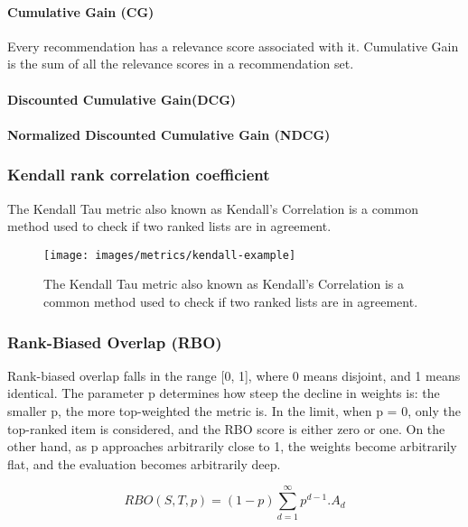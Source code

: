 \paragraph*{Cumulative Gain (CG)}
Every recommendation has a relevance score associated with it. Cumulative Gain is the sum of all the relevance scores in a recommendation set.

\paragraph*{Discounted Cumulative Gain(DCG)}


\paragraph*{Normalized Discounted Cumulative Gain (NDCG)}

\subsubsection{Kendall rank correlation coefficient}
The Kendall Tau metric also known as Kendall's Correlation is a common method used to check if two ranked lists are in agreement.

\begin{figure}[!h]
	\centering
	\texttt{[image: images/metrics/kendall-example]}
	\caption{The Kendall Tau metric also known as Kendall’s Correlation is a common method used to check if two ranked lists are in agreement.}
	\label{fig:kendall-rank-example}
\end{figure}

\subsubsection{Rank-Biased Overlap (RBO)}
Rank-biased overlap \cite{webber2010similarity} falls in the range [0, 1], where 0 means disjoint, and 1 means identical. The parameter p determines how steep the decline in weights is: the smaller p, the
more top-weighted the metric is. In the limit, when p = 0, only the top-ranked item is considered, and the RBO score is either zero or one. 
On the other hand, as p approaches arbitrarily close to 1, the weights become arbitrarily flat, and the evaluation becomes arbitrarily deep.

\begin{equation}
	RBO(S,T,p) = (1-p)\sum_{d=1}^{\infty}p^{d-1}.A_{d}
	\label{eq:rbo}
\end{equation}
